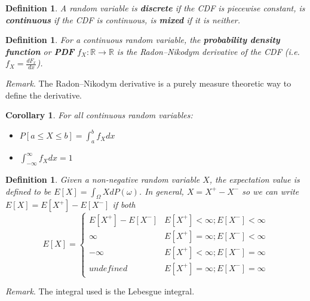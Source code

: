 \documentclass{article}
\newtheorem{defn}[equation]{Definition}
\newtheorem{coro}[equation]{Corollary}
\newenvironment{remark}{\emph{Remark}.}{}
\begin{document}
\begin{defn}
	A random variable is \textbf{discrete} if the CDF is piecewise constant, is \textbf{continuous} if the CDF is continuous, is \textbf{mixed} if it is neither.
\end{defn}

\begin{defn}
	For a continuous random variable, the \textbf{probability density function} or \textbf{PDF} $f_X : \mathbb{R} \to \mathbb{R}$ is the Radon–Nikodym derivative of the CDF (i.e. $f_X = \frac{d F_x}{dx}$).
\end{defn}

\begin{remark}
	The Radon–Nikodym derivative is a purely measure theoretic way to define the derivative.
\end{remark}

\begin{coro}
	For all continuous random variables:
	\begin{itemize}
		\item $P[a \leq X \leq b] = \int_a^b f_X dx$
		\item $\int_{-\infty}^{\infty} f_X dx = 1$
	\end{itemize} 
\end{coro}

\begin{defn}
	Given a non-negative random variable $X$, the expectation value is defined to be $E[X] = \int_\Omega X dP(\omega)$. In general, $X = X^+ - X^-$ so we can write $E[X] = E[X^+] - E[X^-]$ if both 
	$$
	E[X]=
	\begin{cases}
	E[X^+] - E[X^-]  &   E[X^+] < \infty; E[X^-] < \infty \\
	\infty &   E[X^+] = \infty; E[X^-] < \infty \\
	-\infty &   E[X^+] < \infty; E[X^-] = \infty \\
	undefined &   E[X^+] = \infty; E[X^-] = \infty
	\end{cases}
	$$
\end{defn}

\begin{remark}
	The integral used is the Lebesgue integral.
\end{remark}

%
%
\end{document}
